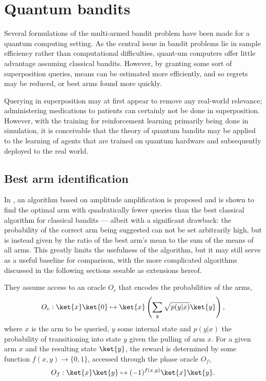 \chapter{Quantum bandits}
\label{chap:qbandits}

Several formulations of the multi-armed bandit problem have been made for a quantum computing setting.
As the central issue in bandit problems lie in sample efficiency rather than computational difficulties, quant-um computers offer little advantage assuming classical bandits.
However, by granting some sort of superposition queries, means can be estimated more efficiently, and so regrets may be reduced, or best arms found more quickly.

Querying in superposition may at first appear to remove any real-world relevance; administering medications to patients can certainly not be done in superposition.
However, with the training for reinforcement learning primarily being done in simulation, it is conceivable that the theory of quantum bandits may be applied to the learning of agents that are trained on quantum hardware and subsequently deployed to the real world.



\section{Best arm identification}
In \cite{casale2020}, an algorithm based on amplitude amplification is proposed and is shown to find the optimal arm with quadratically fewer queries than the best classical algorithm for classical bandits — albeit with a significant drawback: the probability of the correct arm being suggested can not be set arbitrarily high, but is instead given by the ratio of the best arm's mean to the sum of the means of all arms.
This greatly limits the usefulness of the algorithm, but it may still serve as a useful baseline for comparison, with the more complicated algorithms discussed in the following sections seeable as extensions hereof.

They assume access to an oracle $O_e$ that encodes the probabilities of the arms,
\begin{equation}
    O_e: \ket{x}\ket{0} \mapsto \ket{x} \left(\sum_y \sqrt{p(y|x)} \ket{y}\right),
\end{equation}
where $x$ is the arm to be queried, $y$ some internal state and $p(y|x)$ the probability of transitioning into state $y$ given the pulling of arm $x$.
For a given arm $x$ and the resulting state $\ket{y}$, the reward is determined by some function $f(x,y) \to \{0, 1\}$, accessed through the phase oracle $O_f$,
\begin{equation}
    O_f :  \ket{x}\ket{y} \mapsto (-1)^{f(x,y)} \ket{x}\ket{y}.
\end{equation}

